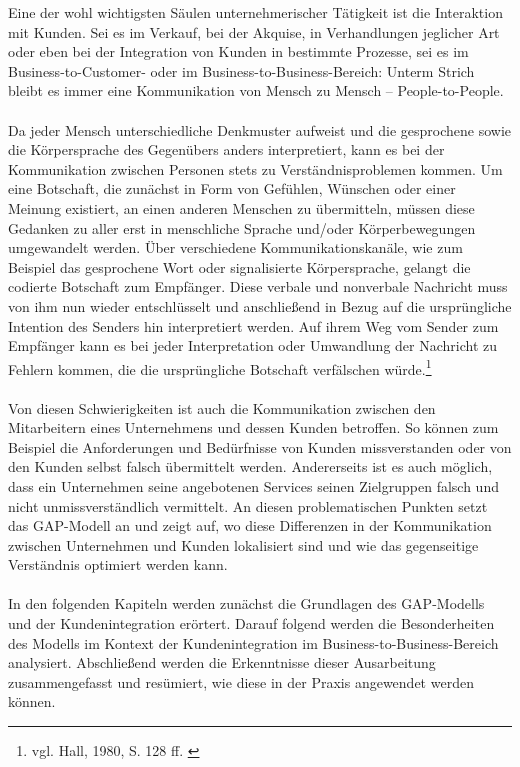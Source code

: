 \label{kapitel1}
Eine der wohl wichtigsten Säulen unternehmerischer Tätigkeit ist die Interaktion mit Kunden. Sei es im Verkauf, bei der Akquise, in Verhandlungen jeglicher Art oder eben bei der Integration von Kunden in bestimmte Prozesse, sei es im Business-to-Customer- oder im Business-to-Business-Bereich: Unterm Strich bleibt es immer eine Kommunikation von Mensch zu Mensch -- People-to-People.
\\ \\
Da jeder Mensch unterschiedliche Denkmuster aufweist und die gesprochene sowie die Körpersprache des Gegenübers anders interpretiert, kann es bei der Kommunikation zwischen Personen stets zu Verständnisproblemen kommen. Um eine Botschaft, die zunächst in Form von Gefühlen, Wünschen oder einer Meinung existiert, an einen anderen Menschen zu übermitteln, müssen diese Gedanken zu aller erst in menschliche Sprache und/oder Körperbewegungen umgewandelt werden. Über verschiedene Kommunikationskanäle, wie zum Beispiel das gesprochene Wort oder signalisierte Körpersprache, gelangt die codierte Botschaft zum Empfänger. Diese verbale und nonverbale Nachricht muss von ihm nun wieder entschlüsselt und anschließend in Bezug auf die ursprüngliche Intention des Senders hin interpretiert werden. Auf ihrem Weg vom Sender zum Empfänger kann es bei jeder Interpretation oder Umwandlung der Nachricht zu Fehlern kommen, die die ursprüngliche Botschaft verfälschen würde.\footnote{vgl. Hall, 1980, S. 128 ff. \cite{Hall1980}}
\\ \\
Von diesen Schwierigkeiten ist auch die Kommunikation zwischen den Mitarbeitern eines Unternehmens und dessen Kunden betroffen. So können zum Beispiel die Anforderungen und Bedürfnisse von Kunden missverstanden oder von den Kunden selbst falsch übermittelt werden. Andererseits ist es auch möglich, dass ein Unternehmen seine angebotenen Services seinen Zielgruppen falsch und nicht unmissverständlich vermittelt. An diesen problematischen Punkten setzt das GAP-Modell an und zeigt auf, wo diese Differenzen in der Kommunikation zwischen Unternehmen und Kunden lokalisiert sind und wie das gegenseitige Verständnis optimiert werden kann.
\\ \\
In den folgenden Kapiteln werden zunächst die Grundlagen des GAP-Modells und der Kundenintegration erörtert. Darauf folgend werden die Besonderheiten des Modells im Kontext der Kundenintegration im Business-to-Business-Bereich analysiert. Abschließend werden die Erkenntnisse dieser Ausarbeitung zusammengefasst und resümiert, wie diese in der Praxis angewendet werden können.



